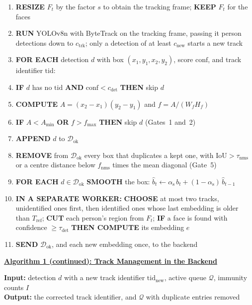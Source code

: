 \documentclass{research}
\newenvironment{algsteps}
  {\setlength{\topsep}{2pt}\begin{enumerate}%
   \setlength{\itemsep}{0pt}\setlength{\parsep}{0pt}}
  {\end{enumerate}}
\begin{document}
\begin{algsteps}
  \item \textbf{RESIZE} $F_t$ by the factor $s$ to obtain the tracking
        frame; \textbf{KEEP} $F_t$ for the faces
  \item \textbf{RUN} YOLOv8n with ByteTrack on the tracking frame,
        passing it person detections down to $c_{\mathrm{trk}}$; only a
        detection of at least $c_{\mathrm{new}}$ starts a new track
  \item \textbf{FOR EACH} detection $d$ with box $(x_1,y_1,x_2,y_2)$,
        score $\text{conf}$, and track identifier $\mathrm{tid}$:
  \item \quad \textbf{IF} $d$ has no $\mathrm{tid}$ \textbf{AND}
        $\text{conf} < c_{\mathrm{det}}$ \textbf{THEN} skip $d$
  \item \quad \textbf{COMPUTE} $A = (x_2-x_1)(y_2-y_1)$ and
        $f = A/(W_fH_f)$
  \item \quad \textbf{IF} $A < A_{\min}$ \textbf{OR} $f > f_{\max}$
        \textbf{THEN} skip $d$ (Gates~1 and~2)
  \item \quad \textbf{APPEND} $d$ to $\mathcal{D}_{\mathrm{ok}}$
  \item \textbf{REMOVE} from $\mathcal{D}_{\mathrm{ok}}$ every box that
        duplicates a kept one, with $\mathrm{IoU} > \tau_{\mathrm{nms}}$
        or a centre distance below $f_{\mathrm{nms}}$ times the mean
        diagonal (Gate~5)
  \item \textbf{FOR EACH} $d \in \mathcal{D}_{\mathrm{ok}}$
        \textbf{SMOOTH} the box: $\hat{b}_t \gets \alpha_{\mathrm{s}}\,b_t
        + (1-\alpha_{\mathrm{s}})\,\hat{b}_{t-1}$
  \item \textbf{IN A SEPARATE WORKER:} \textbf{CHOOSE} at most two
        tracks, unidentified ones first, then identified ones whose last
        embedding is older than $T_{\mathrm{ref}}$; \textbf{CUT} each
        person's region from $F_t$; \textbf{IF} a face is found with
        confidence $\geq \tau_{\mathrm{det}}$ \textbf{THEN COMPUTE} its
        embedding $e$
  \item \textbf{SEND} $\mathcal{D}_{\mathrm{ok}}$, and each new embedding
        once, to the backend
\end{algsteps}

\noindent\textbf{\underline{Algorithm 1 (continued): Track Management in
the Backend}}

\noindent\textbf{Input:} detection $d$ with a new track identifier
$\mathrm{tid}_{\mathrm{new}}$, active queue $\mathcal{Q}$, immunity
counts $I$\\
\noindent\textbf{Output:} the corrected track identifier, and
$\mathcal{Q}$ with duplicate entries removed
\end{document}
